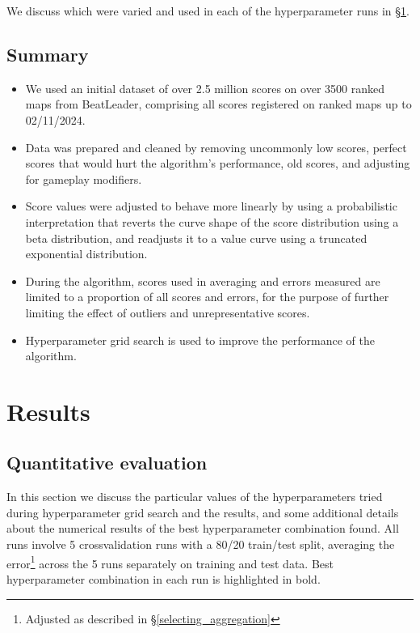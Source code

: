 \documentclass[12pt,a4paper]{article}
\begin{document}
We discuss which were varied and used in each of the hyperparameter runs in \S \ref{results}.

\subsection{Summary}

\begin{itemize}

\item We used an initial dataset of over 2.5 million scores on over 3500 ranked maps from BeatLeader, comprising all scores registered on ranked maps up to 02/11/2024.
\item Data was prepared and cleaned by removing uncommonly low scores, perfect scores that would hurt the algorithm's performance, old scores, and adjusting for gameplay modifiers.
\item Score values were adjusted to behave more linearly by using a probabilistic interpretation that reverts the curve shape of the score distribution using a beta distribution, and readjusts it to a value curve using a truncated exponential distribution.
\item During the algorithm, scores used in averaging and errors measured are limited to a proportion of all scores and errors, for the purpose of further limiting the effect of outliers and unrepresentative scores.
\item Hyperparameter grid search is used to improve the performance of the algorithm.

\end{itemize}

\section{Results}
\label{results}

\subsection{Quantitative evaluation}

In this section we discuss the particular values of the hyperparameters tried during hyperparameter grid search and the results, and some additional details about the numerical results of the best hyperparameter combination found. All runs involve 5 crossvalidation runs with a 80/20 train/test split, averaging the error\footnote{Adjusted as described in \S \ref{selecting_aggregation}} across the 5 runs separately on training and test data. Best hyperparameter combination in each run is highlighted in bold.
\end{document}
